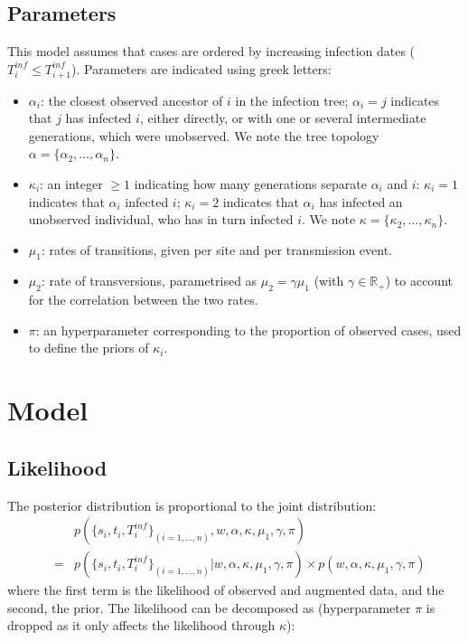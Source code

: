 \documentclass[10pt]{article}
\begin{document}
\subsection*{Parameters}
This model assumes that cases are ordered by increasing infection dates ($T_i^{inf} \leq T_{i+1}^{inf}$).
Parameters are indicated using greek letters:
\begin{itemize}
         \item $\alpha_i$: the closest observed ancestor of $i$ in the infection tree; $\alpha_i=j$ indicates that $j$ has infected $i$, either directly, or with one or several intermediate generations, which were unobserved. 
We note the tree topology $\alpha = \{\alpha_2, \ldots, \alpha_n\}$.
 	\item $\kappa_i$: an integer $\geq 1$ indicating how many generations separate $\alpha_i$ and $i$: $\kappa_i=1$ indicates that $\alpha_i$ infected $i$; $\kappa_i=2$ indicates that $\alpha_i$ has infected an unobserved individual, who has in turn infected $i$.
We note $\kappa = \{\kappa_2, \ldots, \kappa_n\}$.
	\item $\mu_1$: rates of transitions, given per site and per transmission event.
	\item $\mu_2 $: rate of transversions, parametrised as $\mu_2 = \gamma \mu_1$ (with $\gamma \in \mathbb{R}_+$) to account for the correlation between the two rates.
	\item $\pi$: an hyperparameter corresponding to the proportion of observed cases, used to define the priors of $\kappa_i$.
\end{itemize}






\section*{Model}

\subsection*{Likelihood}

The posterior distribution is proportional to the joint distribution:
\begin{eqnarray}
& & p(\{s_i, t_i, T_i^{inf}\}_{(i=1,\ldots,n)}, w,  \alpha, \kappa, \mu_1, \gamma, \pi)\\
& = & p(\{s_i, t_i, T_i^{inf}\}_{(i=1,\ldots,n)}| w,  \alpha, \kappa, \mu_1, \gamma, \pi) \times p( w,  \alpha, \kappa, \mu_1, \gamma, \pi)
\end{eqnarray}
where the first term is the likelihood of observed and augmented data, and the second, the prior.
The likelihood can be decomposed as (hyperparameter $\pi$ is dropped as it only affects the likelihood through $\kappa$):
\end{document}
